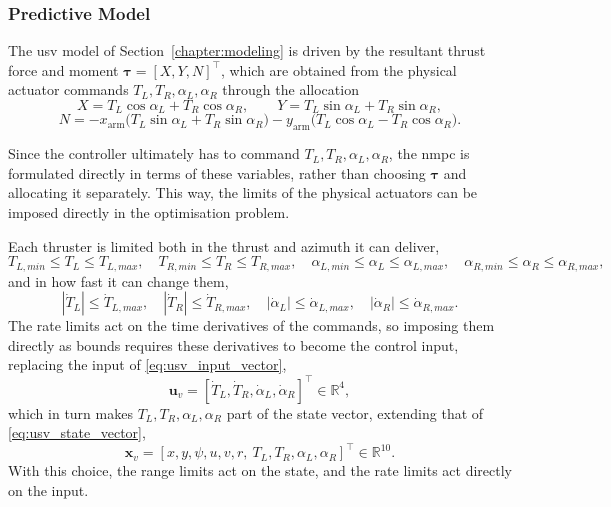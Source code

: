 \subsubsection*{Predictive Model}

The \gls{usv} model of Section~\ref{chapter:modeling} is driven by the resultant thrust force and moment $\boldsymbol\tau = [X,Y,N]^\top$, which are obtained from the physical actuator commands $T_L, T_R, \alpha_L, \alpha_R$ through the allocation
\begin{equation}
    X = T_L\cos\alpha_L + T_R\cos\alpha_R, \qquad Y = T_L\sin\alpha_L + T_R\sin\alpha_R,
    \label{eq:usv_mpc_alloc_force}
\end{equation}
\begin{equation}
    N = -x_{\mathrm{arm}}\big(T_L\sin\alpha_L+T_R\sin\alpha_R\big) - y_{\mathrm{arm}}\big(T_L\cos\alpha_L-T_R\cos\alpha_R\big).
    \label{eq:usv_mpc_alloc_moment}
\end{equation}

Since the controller ultimately has to command $T_L, T_R, \alpha_L, \alpha_R$, the \gls{nmpc} is formulated directly in terms of these variables, rather than choosing $\boldsymbol\tau$ and allocating it separately. This way, the limits of the physical actuators can be imposed directly in the optimisation problem.

Each thruster is limited both in the thrust and azimuth it can deliver,
\begin{equation}
    T_{L,min} \le T_L \le T_{L,max}, \quad T_{R,min} \le T_R \le T_{R,max}, \quad \alpha_{L,min} \le \alpha_L \le \alpha_{L,max}, \quad \alpha_{R,min} \le \alpha_R \le \alpha_{R,max},
    \label{eq:usv_mpc_state_bounds}
\end{equation}
and in how fast it can change them,
\begin{equation}
    |\dot{T}_L| \le \dot{T}_{L,max}, \quad |\dot{T}_R| \le \dot{T}_{R,max}, \quad |\dot{\alpha}_L| \le \dot{\alpha}_{L,max}, \quad |\dot{\alpha}_R| \le \dot{\alpha}_{R,max}.
    \label{eq:usv_mpc_input_bounds}
\end{equation}
The rate limits act on the time derivatives of the commands, so imposing them directly as bounds requires these derivatives to become the control input, replacing the input of \eqref{eq:usv_input_vector},
\begin{equation}
    \mathbf{u}_v = [\dot{T}_L, \dot{T}_R, \dot{\alpha}_L, \dot{\alpha}_R]^\top \in \mathbb{R}^4,
    \label{eq:usv_mpc_input_augmented}
\end{equation}
which in turn makes $T_L, T_R, \alpha_L, \alpha_R$ part of the state vector, extending that of \eqref{eq:usv_state_vector},
\begin{equation}
    \mathbf{x}_v = [x, y, \psi, u, v, r,\ T_L, T_R, \alpha_L, \alpha_R]^\top \in \mathbb{R}^{10}.
    \label{eq:usv_mpc_state_augmented}
\end{equation}
With this choice, the range limits act on the state, and the rate limits act directly on the input.


